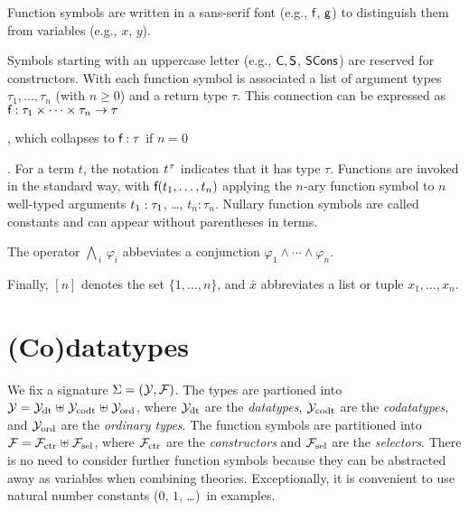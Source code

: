 \begin{report}
Function symbols are written in a sans-serif font (e.g., $\textsf{f}$, $\textsf{g}$) to
distinguish them from variables (e.g., $x$, $y$).
\end{report}
Symbols starting with an uppercase letter (e.g.,
$\textsf{C}, \textsf{S}$, $\textsf{SCons}$) are reserved for constructors. With each function symbol 
is associated a list of argument types $\tau_1,\ldots,\tau_n$ (with $n \ge 0$)
and a return type $\tau$. This connection can be expressed %
as $\textsf{f} : \tau_1 \times \cdots \times \tau_n \to \tau$\begin{report},
which collapses to $\textsf{f} : \tau$ if $n = 0$\end{report}.
For a term $t$, the notation $t\typ{\tau}$ indicates that it has type $\tau$.
Functions are invoked in the standard way, with $\textsf{f}(t_1,\ldots,t_n)$
applying the $n$-ary function symbol
 to $n$ well-typed arguments $t_1 :\nobreak \tau_1$, \ldots, $t_n :
\tau_n$. Nullary function symbols are called constants and can appear without
parentheses in terms.
\begin{report}%
The operator $\bigwedge_{\,i}\, \varphi_i$ abbeviates a conjunction
$\varphi_1 \mathrel\land \cdots \mathrel\land \varphi_n$. \end{report}%
Finally, $[n]$ denotes the set $\{1,\ldots, n\}$, and
$\bar x$ abbreviates a list or tuple $x_1,\ldots,x_n$.



\section{%
(Co)datatypes}
\label{sec:the-theory-of-co-datatypes}


We fix a signature $\mathrm{\Sigma} = (\mathcal{Y}, \mathcal{F})$. The types are partioned into
$\mathcal{Y} = \mathcal{Y}_{\mathrm{dt}} \mathrel{\uplus} \mathcal{Y}_{\mathrm{codt}} \mathrel{\uplus} \mathcal{Y}_{\mathrm{ord}}$, where $\mathcal{Y}_{\mathrm{dt}}$ are the
\emph{datatypes}, $\mathcal{Y}_{\mathrm{codt}}$ are the \emph{codatatypes}, and $\mathcal{Y}_{\mathrm{ord}}$ are the %
\emph{ordinary types}. The function symbols are partitioned into $\mathcal{F} = \mathcal{F}_{\mathrm{ctr}}
\mathrel{\uplus} \mathcal{F}_{\mathrm{sel}}$, where $\mathcal{F}_{\mathrm{ctr}}$ are the \emph{constructors} and $\mathcal{F}_{\mathrm{sel}}$ are the
\emph{selectors}. There is no need to consider further function symbols
because they can be abstracted away as variables when combining theories.
Exceptionally, it is convenient to use natural number
constants ($0$, $1$, \ldots)\ in examples.

